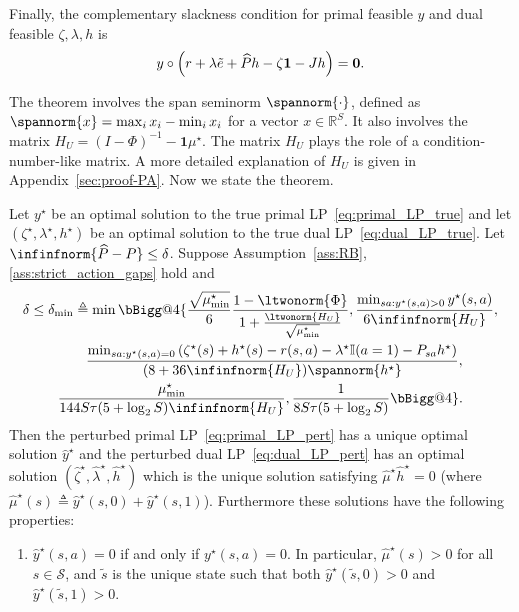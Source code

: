 \documentclass[mnsc,nonblindrev]{informs3}
\makeatletter
\newcommand{\R}{\mathbb{R}}
\newcommand{\Phat}{\widehat{P}}
\newcommand{\one}{\mathbf{1}}
\newcommand{\hhat}{\widehat{h}}
\newcommand{\States}{\mathcal{S}}
\newcommand{\zero}{\mathbf{0}}
\newcommand{\muhat}{\widehat{\mu}}
\newcommand{\yhat}{\widehat{y}}
\newcommand{\zetahat}{\widehat{\zeta}}
\newcommand{\lambdahat}{\widehat{\lambda}}
\newcommand{\vast}{\bBigg@{4}}
\makeatother
\begin{document}
\par\vspace{1em}
Finally, the complementary slackness condition for primal feasible $y$ and dual feasible $\zeta, \lambda, h$ is 
\begin{align}
    y \circ \left( r + \lambda \Tilde{e} + \Phat h - \zeta \one - J h \right) = \zero. \label{eq:LP_CS_pert}
\end{align}

The theorem involves the span seminorm $\spannorm{\cdot}$, defined as $\spannorm{x} = \max_{i} x_i - \min_i x_i$ for a vector $x \in \R^S$. It also involves the matrix
\(
    H_U=(I-\Phi)^{-1}-\one\mu^\star.
\)
The matrix \(H_U\) plays the role of a condition-number-like matrix. A more detailed explanation of \(H_U\)  is given in Appendix~\ref{sec:proof-PA}. Now we state the theorem.
\begin{theorem}
\label{thm:LP_perturbation_main_complete}
    Let $y^\star$ be an optimal solution to the true primal LP~\eqref{eq:primal_LP_true} and let $(\zeta^\star, \lambda^\star, h^\star)$ be an optimal solution to the true dual LP~\eqref{eq:dual_LP_true}. Let $\infinfnorm{\Phat - P} \leq \delta$. Suppose Assumption~\ref{ass:RB}, \ref{ass:strict_action_gaps} hold and   
        \begin{multline}\label{eq:def-delta-min}
            \delta \leq \delta_{\min}\triangleq \min \vast\{\frac{\sqrt{\mu^\star_{\min}}}{6}\frac{1 - \ltwonorm{\Phi}}{1 + \frac{\ltwonorm{H_{U}}}{\sqrt{\mu^\star_{\min}}} },  \frac{\min_{sa : y^\star(s,a) > 0} y^\star(s,a)}{6\infinfnorm{H_{U}} } , \\
             \qquad \frac{\min_{sa:y^\star(s,a)=0} \left(\zeta^\star(s) +  h^\star(s) -r(s, a) - \lambda^\star \mathbb{I}(a=1) - P_{s a}h^\star\right)}{(8 + 36\infinfnorm{H_U})  \spannorm{h^\star}}, \\
             \frac{\mu^\star_{\min}}{144S\tau(5+\log_2S)\infinfnorm{H_U}},
             \frac{1}{8S\tau(5+\log_2S)}  \vast\}.
        \end{multline}
    Then the perturbed primal LP~\eqref{eq:primal_LP_pert} has a unique optimal solution $\yhat^\star$ and the perturbed dual LP~\eqref{eq:dual_LP_pert} has an optimal solution $(\zetahat^\star, \lambdahat^\star, \hhat^\star)$ which is the unique solution satisfying $\muhat^\star \hhat^\star = 0$ (where $\muhat^\star(s) \triangleq \yhat^\star(s,0) + \yhat^\star(s,1)$). Furthermore these solutions have the following properties:
    \begin{enumerate}
        \item $\yhat^\star(s,a)=0$ if and only if $y^\star(s,a) = 0$. In particular, $\muhat^\star(s) > 0$ for all $s \in \States$, and $\tilde{s}$ is the unique state such that both $\yhat^\star(\tilde{s},0) >0$ and $\yhat^\star(\tilde{s},1) >0$.

\end{enumerate}
\end{theorem}
\end{document}
